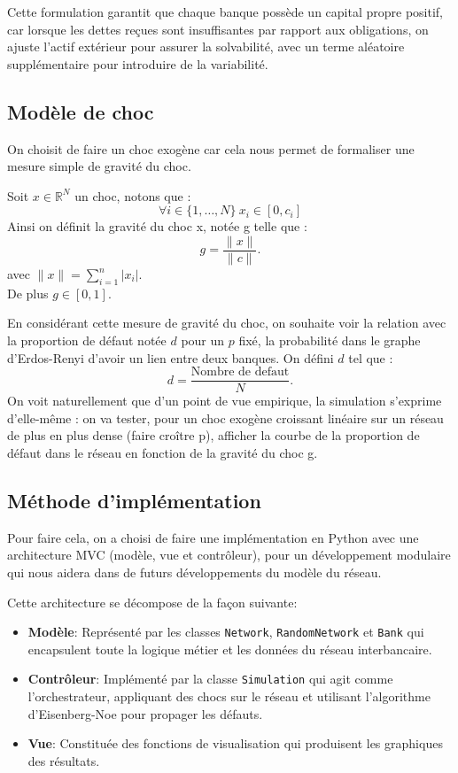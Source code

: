 Cette formulation garantit que chaque banque possède un capital propre positif,
car lorsque les dettes reçues sont insuffisantes par rapport aux obligations,
on ajuste l'actif extérieur pour assurer la solvabilité, avec un terme aléatoire supplémentaire pour introduire de la variabilité.

\subsection{Modèle de choc}\label{subsec:modele-de-choc}
On choisit de faire un choc exogène car cela nous permet de formaliser une mesure simple de gravité du choc.

Soit $x\in \mathbb{R}^N$ un choc, notons que :
$$\forall i \in \{1, \ldots, N\} \ x_i \in [0, c_i]$$
Ainsi on définit la gravité du choc x, notée g telle que :
$$g = \frac{\|x\|}{\|c\|}.$$
avec $\|x\| = \sum_{i=1}^{n} |x_i|.$\\
De plus $g \in [0, 1]$.

En considérant cette mesure de gravité du choc, on souhaite voir la relation avec la proportion de défaut notée $d$
pour un $p$ fixé, la probabilité dans le graphe d'Erdos-Renyi d'avoir un lien entre deux banques.
On défini $d$ tel que :
$$d = \frac{\text{Nombre de defaut}}{N}.$$
On voit naturellement que d'un point de vue empirique, la simulation s'exprime d'elle-même : on va tester, pour un choc exogène croissant linéaire sur un réseau de plus en plus dense (faire croître p), afficher la courbe
de la proportion de défaut dans le réseau en fonction de la gravité du choc g.

\subsection{Méthode d'implémentation}\label{subsec:methode-d'implementation}
Pour faire cela, on a choisi de faire une implémentation en Python avec une architecture MVC (modèle, vue et contrôleur), pour un développement modulaire qui nous aidera dans de futurs développements du modèle du réseau.

Cette architecture se décompose de la façon suivante:
\begin{itemize}
    \item \textbf{Modèle}: Représenté par les classes \texttt{Network}, \texttt{RandomNetwork} et \texttt{Bank} qui encapsulent toute la logique métier et les données du réseau interbancaire.
    \item \textbf{Contrôleur}: Implémenté par la classe \texttt{Simulation} qui agit comme l'orchestrateur, appliquant des chocs sur le réseau et utilisant l'algorithme d'Eisenberg-Noe pour propager les défauts.
    \item \textbf{Vue}: Constituée des fonctions de visualisation qui produisent les graphiques des résultats.
\end{itemize}

